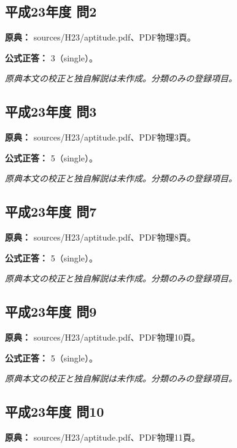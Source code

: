 \subsection{平成23年度 問2}
\label{q:h23-reg-apt-02}

\noindent\textbf{原典：} sources/H23/aptitude.pdf、PDF物理3頁。

\textbf{公式正答：} 3（single）。

\par\textit{原典本文の校正と独自解説は未作成。分類のみの登録項目。}

\subsection{平成23年度 問3}
\label{q:h23-reg-apt-03}

\noindent\textbf{原典：} sources/H23/aptitude.pdf、PDF物理3頁。

\textbf{公式正答：} 5（single）。

\par\textit{原典本文の校正と独自解説は未作成。分類のみの登録項目。}

\subsection{平成23年度 問7}
\label{q:h23-reg-apt-07}

\noindent\textbf{原典：} sources/H23/aptitude.pdf、PDF物理8頁。

\textbf{公式正答：} 5（single）。

\par\textit{原典本文の校正と独自解説は未作成。分類のみの登録項目。}

\subsection{平成23年度 問9}
\label{q:h23-reg-apt-09}

\noindent\textbf{原典：} sources/H23/aptitude.pdf、PDF物理10頁。

\textbf{公式正答：} 5（single）。

\par\textit{原典本文の校正と独自解説は未作成。分類のみの登録項目。}

\subsection{平成23年度 問10}
\label{q:h23-reg-apt-10}

\noindent\textbf{原典：} sources/H23/aptitude.pdf、PDF物理11頁。

